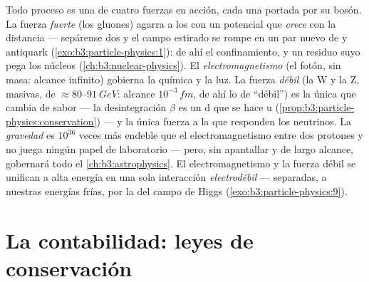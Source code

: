 \begin{remark}\label{rem:b3:particle-physics:forces}
Todo proceso es una de cuatro fuerzas en acción, cada una portada por su
bosón. La fuerza \emph{fuerte} (los gluones) agarra a los  con un
potencial que \emph{crece} con la distancia --- sepárense dos 
y el campo estirado se rompe en un par nuevo de
 y antiquark (\cref{exo:b3:particle-physics:1}): de ahí el
confinamiento, y un residuo suyo pega los núcleos
(\cref{ch:b3:nuclear-physics}). El \emph{electromagnetismo} (el fotón,
sin masa: alcance infinito) gobierna la química y la luz. La
fuerza \emph{débil} (la W y la Z, masivas, de
$\approx80$--$\qty{91}{GeV}$: alcance $10^{-3}\,\unit{fm}$,
de ahí lo de ``débil'') es la única que cambia de sabor --- la desintegración $\beta$ es
un  d que se hace u
(\cref{prop:b3:particle-physics:conservation}) --- y la única
fuerza a la que responden los neutrinos. La \emph{gravedad} es $10^{36}$ veces
más endeble que el electromagnetismo entre dos protones y no juega ningún
papel de laboratorio --- pero, sin apantallar y de largo alcance, gobernará
todo el \cref{ch:b3:astrophysics}. El electromagnetismo y la fuerza
débil se unifican a alta energía en una sola interacción
\emph{electrodébil} --- separadas, a nuestras energías frías, por la  del campo de Higgs (\cref{exo:b3:particle-physics:9}).
\end{remark}

\section{La contabilidad: leyes de conservación}


